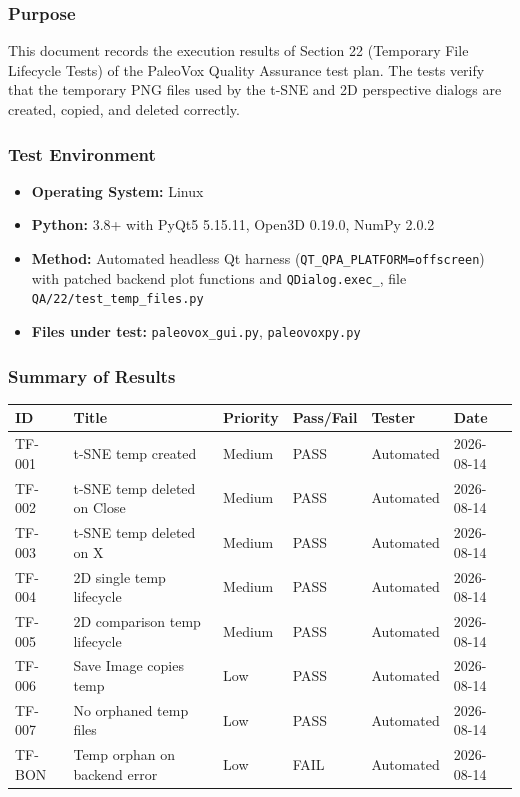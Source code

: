 \documentclass[12pt,a4paper]{article}
\begin{document}
\subsubsection{Purpose}
This document records the execution results of Section 22 (Temporary File
Lifecycle Tests) of the PaleoVox Quality Assurance test plan. The tests verify
that the temporary PNG files used by the t-SNE and 2D perspective dialogs are
created, copied, and deleted correctly.

\subsubsection{Test Environment}
\begin{itemize}
  \item \textbf{Operating System:} Linux
  \item \textbf{Python:} 3.8+ with PyQt5 5.15.11, Open3D 0.19.0, NumPy 2.0.2
  \item \textbf{Method:} Automated headless Qt harness
    (\texttt{QT\_QPA\_PLATFORM=offscreen}) with patched backend plot functions
    and \texttt{QDialog.exec\_}, file \texttt{QA/22/test\_temp\_files.py}
  \item \textbf{Files under test:} \texttt{paleovox\_gui.py},
    \texttt{paleovoxpy.py}
\end{itemize}

\subsubsection{Summary of Results}
\begin{longtable}{p{1.2cm}p{5.5cm}p{1.5cm}p{1.5cm}p{1.5cm}p{2cm}}
\toprule
\textbf{ID} & \textbf{Title} & \textbf{Priority} & \textbf{Pass/Fail} & \textbf{Tester} & \textbf{Date} \\
\midrule
TF-001 & t-SNE temp created            & Medium & PASS & Automated & 2026-08-14 \\
TF-002 & t-SNE temp deleted on Close   & Medium & PASS & Automated & 2026-08-14 \\
TF-003 & t-SNE temp deleted on X       & Medium & PASS & Automated & 2026-08-14 \\
TF-004 & 2D single temp lifecycle      & Medium & PASS & Automated & 2026-08-14 \\
TF-005 & 2D comparison temp lifecycle  & Medium & PASS & Automated & 2026-08-14 \\
TF-006 & Save Image copies temp        & Low    & PASS & Automated & 2026-08-14 \\
TF-007 & No orphaned temp files        & Low    & PASS & Automated & 2026-08-14 \\
TF-BON & Temp orphan on backend error  & Low    & FAIL & Automated & 2026-08-14 \\
\bottomrule
\end{longtable}
\end{document}
